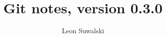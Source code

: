 \documentclass{charun}
\title{Git notes, version 0.3.0}
\author{Leon Suwalski}
\begin{document}
\begin{multicols*}{2}
\maketitle
\raggedright






\end{multicols*}
\end{document}

